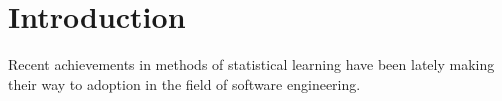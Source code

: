 \section{Introduction}

Recent achievements in methods of statistical learning have been lately making their way
to adoption in the field of software engineering.

